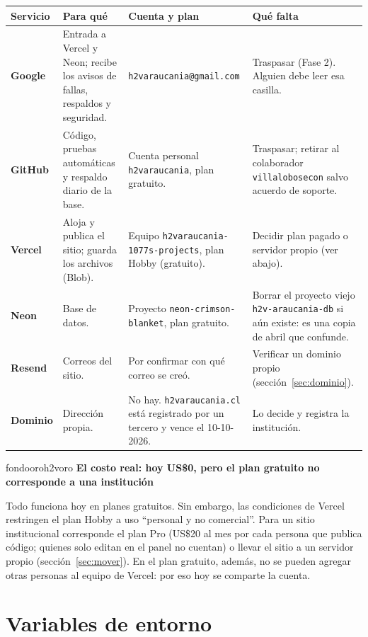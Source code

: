 \documentclass[11pt,letterpaper]{article}
\newcommand{\var}[1]{\nolinkurl{#1}}
\newcommand{\titulorecuadro}[2]{{\bfseries\color{#1}#2}\par\vspace{2pt}}
\newcommand{\cab}[1]{\textbf{\color{h2vgris}#1}}
\newcommand{\fila}[1]{\textbf{\color{h2vazul}#1}}
\begin{document}
\begin{tabularx}{\textwidth}{@{}P{2.1cm}P{4.1cm}P{4.4cm}Y@{}}
\toprule
\cab{Servicio} & \cab{Para qué} & \cab{Cuenta y plan} & \cab{Qué falta}\\
\midrule
\fila{Google} & Entrada a Vercel y Neon; recibe los avisos de fallas, respaldos y seguridad. & \var{h2varaucania@gmail.com} & Traspasar (Fase 2). Alguien debe leer esa casilla.\\
\fila{GitHub} & Código, pruebas automáticas y respaldo diario de la base. & Cuenta personal \var{h2varaucania}, plan gratuito. & Traspasar; retirar al colaborador \var{villalobosecon} salvo acuerdo de soporte.\\
\fila{Vercel} & Aloja y publica el sitio; guarda los archivos (Blob). & Equipo \var{h2varaucania-1077s-projects}, plan Hobby (gratuito). & Decidir plan pagado o servidor propio (ver abajo).\\
\fila{Neon} & Base de datos. & Proyecto \var{neon-crimson-blanket}, plan gratuito. & Borrar el proyecto viejo \var{h2v-araucania-db} si aún existe: es una copia de abril que confunde.\\
\fila{Resend} & Correos del sitio. & Por confirmar con qué correo se creó. & Verificar un dominio propio (sección~\ref{sec:dominio}).\\
\fila{Dominio} & Dirección propia. & No hay. \var{h2varaucania.cl} está registrado por un tercero y vence el 10-10-2026. & Lo decide y registra la institución.\\
\bottomrule
\end{tabularx}

\begin{recuadro}{fondooro}{h2voro}
\titulorecuadro{h2vazul}{El costo real: hoy US\$0, pero el plan gratuito no corresponde a una institución}
Todo funciona hoy en planes gratuitos. Sin embargo, las condiciones de Vercel restringen el plan Hobby a uso ``personal y no comercial''. Para un sitio institucional corresponde el plan Pro (US\$20 al mes por cada persona que publica código; quienes solo editan en el panel no cuentan) o llevar el sitio a un servidor propio (sección~\ref{sec:mover}). En el plan gratuito, además, no se pueden agregar otras personas al equipo de Vercel: por eso hoy se comparte la cuenta.
\end{recuadro}

\section{Variables de entorno}\label{sec:variables}
\end{document}
